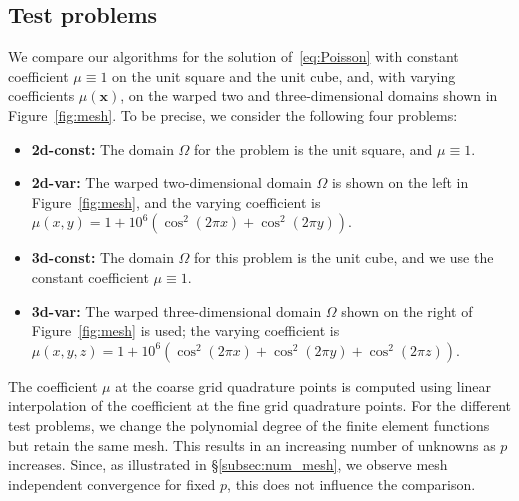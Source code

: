 \documentclass[smallcondensed,final]{svjour3}     %
\newcommand{\bs}[1]{\ensuremath{\boldsymbol #1}}
\begin{document}
\subsection{Test problems}\label{subsec:tests}
We compare our algorithms for the solution of~\eqref{eq:Poisson} with
constant coefficient $\mu\equiv 1$ on the unit square and the unit cube,
and, with varying coefficients $\mu(\bs x)$, on the warped two and
three-dimensional domains shown in Figure~\ref{fig:mesh}. To be
precise, we consider the following four problems:
\begin{itemize}
\item[] {\bf 2d-const:} The domain $\Omega$ for the problem is the unit square, and $\mu\equiv
  1$.
\item[] {\bf 2d-var:} The warped two-dimensional domain $\Omega$
  is shown on the left in Figure~\ref{fig:mesh}, and the
  varying coefficient is $\mu(x,y) = 1 + 10^6(\cos^2(2\pi x) +
  \cos^2(2\pi y))$.
\item[] {\bf 3d-const:} The domain $\Omega$ for this problem is the unit cube,
  and we use the constant coefficient $\mu\equiv 1$.
\item[] {\bf 3d-var:} The warped three-dimensional domain $\Omega$
  shown on the right of Figure~\ref{fig:mesh} is used; the
  varying coefficient is $\mu(x,y,z) = 1 + 10^6(\cos^2(2\pi x) +
  \cos^2(2\pi y) + \cos^2(2\pi z))$.
\end{itemize}

The coefficient $\mu$ at the coarse grid quadrature points is computed
using linear interpolation of the coefficient at the fine grid
quadrature points. For the different test problems, we change the
polynomial degree of the finite element functions but retain the same
mesh. This results in an increasing number of unknowns as $p$
increases. Since, as illustrated in \S\ref{subsec:num_mesh}, we
observe mesh independent convergence for fixed $p$, this does not
influence the comparison.
\end{document}
